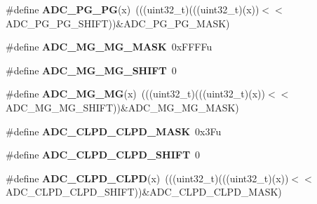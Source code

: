 \begin{DoxyCompactItemize}
\item 
\#define {\bfseries A\+D\+C\+\_\+\+P\+G\+\_\+\+PG}(x)~(((uint32\+\_\+t)(((uint32\+\_\+t)(x))$<$$<$A\+D\+C\+\_\+\+P\+G\+\_\+\+P\+G\+\_\+\+S\+H\+I\+FT))\&A\+D\+C\+\_\+\+P\+G\+\_\+\+P\+G\+\_\+\+M\+A\+SK)\hypertarget{group__ADC__Register__Masks_ga4b6bf1c895aa431e08bed733de13e71e}{}\label{group__ADC__Register__Masks_ga4b6bf1c895aa431e08bed733de13e71e}

\item 
\#define {\bfseries A\+D\+C\+\_\+\+M\+G\+\_\+\+M\+G\+\_\+\+M\+A\+SK}~0x\+F\+F\+F\+Fu\hypertarget{group__ADC__Register__Masks_ga9f415258af1bad0159dd605efccd043b}{}\label{group__ADC__Register__Masks_ga9f415258af1bad0159dd605efccd043b}

\item 
\#define {\bfseries A\+D\+C\+\_\+\+M\+G\+\_\+\+M\+G\+\_\+\+S\+H\+I\+FT}~0\hypertarget{group__ADC__Register__Masks_ga4b2717da089f0de5bd41ef91001b7cfe}{}\label{group__ADC__Register__Masks_ga4b2717da089f0de5bd41ef91001b7cfe}

\item 
\#define {\bfseries A\+D\+C\+\_\+\+M\+G\+\_\+\+MG}(x)~(((uint32\+\_\+t)(((uint32\+\_\+t)(x))$<$$<$A\+D\+C\+\_\+\+M\+G\+\_\+\+M\+G\+\_\+\+S\+H\+I\+FT))\&A\+D\+C\+\_\+\+M\+G\+\_\+\+M\+G\+\_\+\+M\+A\+SK)\hypertarget{group__ADC__Register__Masks_gaca09277ff124324eca091b84eb116176}{}\label{group__ADC__Register__Masks_gaca09277ff124324eca091b84eb116176}

\item 
\#define {\bfseries A\+D\+C\+\_\+\+C\+L\+P\+D\+\_\+\+C\+L\+P\+D\+\_\+\+M\+A\+SK}~0x3\+Fu\hypertarget{group__ADC__Register__Masks_gaae8d6090ede9d73497ae3e0b4fa2c6cd}{}\label{group__ADC__Register__Masks_gaae8d6090ede9d73497ae3e0b4fa2c6cd}

\item 
\#define {\bfseries A\+D\+C\+\_\+\+C\+L\+P\+D\+\_\+\+C\+L\+P\+D\+\_\+\+S\+H\+I\+FT}~0\hypertarget{group__ADC__Register__Masks_ga14a354b0de262fc93f30472e99bbe9bc}{}\label{group__ADC__Register__Masks_ga14a354b0de262fc93f30472e99bbe9bc}

\item 
\#define {\bfseries A\+D\+C\+\_\+\+C\+L\+P\+D\+\_\+\+C\+L\+PD}(x)~(((uint32\+\_\+t)(((uint32\+\_\+t)(x))$<$$<$A\+D\+C\+\_\+\+C\+L\+P\+D\+\_\+\+C\+L\+P\+D\+\_\+\+S\+H\+I\+FT))\&A\+D\+C\+\_\+\+C\+L\+P\+D\+\_\+\+C\+L\+P\+D\+\_\+\+M\+A\+SK)\hypertarget{group__ADC__Register__Masks_gad24bf778e8245118707b43a195a7ddf3}{}\label{group__ADC__Register__Masks_gad24bf778e8245118707b43a195a7ddf3}


\end{DoxyCompactItemize}
